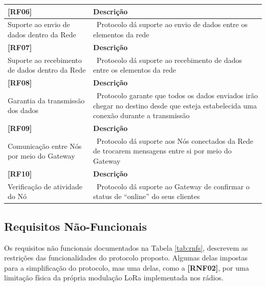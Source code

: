\begin{longtable}{|p{3.5cm}|p{9.0cm}|}
    \hline
    \textbf{[RF06]} & \textbf{Descrição} \\
    \hline
    Suporte ao \newline envio de dados \newline dentro da Rede & \
    Protocolo dá suporte ao envio de dados entre os \newline elementos da rede \\
    
    \hline
    \textbf{[RF07]} & \textbf{Descrição} \\
    \hline
    Suporte ao recebimento de dados \newline dentro da Rede & \
    Protocolo dá suporte ao recebimento de dados entre os elementos da rede \\
    
    \hline
    \textbf{[RF08]} & \textbf{Descrição} \\
    \hline
    Garantia da \newline transmissão \newline dos dados & \
    Protocolo garante que todos os dados enviados irão chegar no destino desde que esteja estabelecida uma conexão durante a transmissão \\
    
    \hline
    \textbf{[RF09]} & \textbf{Descrição} \\
    \hline
    Comunicação entre \newline Nós por meio do \newline Gateway & \
    Protocolo dá suporte aos Nós conectados da Rede de trocarem mensagens entre si por meio do Gateway \\
    
    \hline
    \textbf{[RF10]} & \textbf{Descrição} \\
    \hline
    Verificação de \newline atividade do Nó & \
    Protocolo dá suporte ao Gateway de confirmar o status de “online” do seus clientes \\
    \hline
\end{longtable}

\subsection{Requisitos Não-Funcionais}

Os requisitos não funcionais documentados na Tabela \ref{tab:rnfs}, descrevem
as restrições das funcionalidades do protocolo proposto. Algumas delas impostas
para a simplificação do protocolo, mas uma delas, como a \textbf{[RNF02]}, por
uma limitação física da própria modulação LoRa implementada nos rádios.
\newline
\newline

